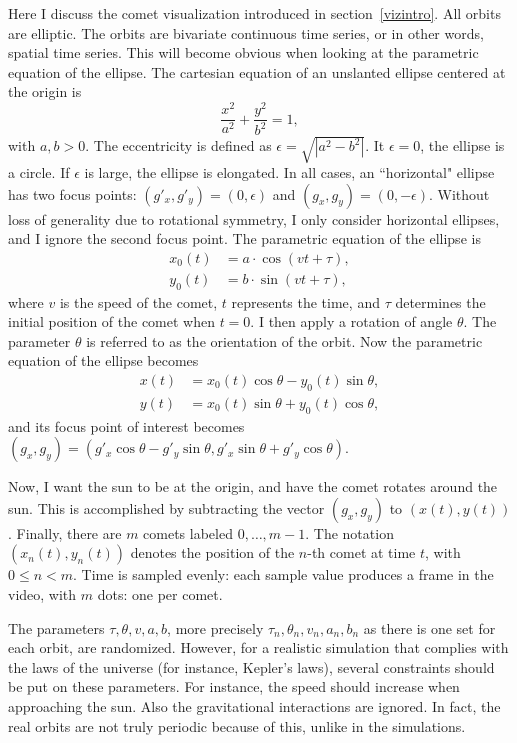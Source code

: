 \documentclass[oneside,10pt]{book}
\begin{document}
Here I discuss the comet visualization introduced in section~\ref{vizintro}. All orbits are elliptic. The orbits are bivariate continuous time series, or in other words, spatial time series. This will become obvious when looking at the parametric equation of the ellipse. The cartesian equation of an unslanted ellipse centered at the origin is
$$\frac{x^2}{a^2}+\frac{y^2}{b^2}=1,
$$
with $a,b>0$. The eccentricity is defined as $\epsilon=\sqrt{|a^2-b^2|}$. It $\epsilon=0$, the ellipse is a circle. If $\epsilon$ is large, the ellipse is elongated. In all cases, an ``horizontal" ellipse has two focus points: $(g'_x,g'_y)=(0, \epsilon)$ and $(g_x,g_y)=(0,-\epsilon)$. Without loss of generality due to rotational symmetry, I only consider horizontal ellipses, and I ignore the second focus point. The parametric equation of the ellipse is
\begin{align}
x_0(t) & = a\cdot\cos(vt+\tau),\nonumber \\
y_0(t) & = b\cdot\sin(vt+\tau),\nonumber
\end{align}
where $v$ is the speed of the comet, $t$ represents the time, and $\tau$ determines the initial position of the comet when $t=0$.
I then apply a rotation of angle $\theta$. The parameter $\theta$ is referred to as the orientation of the orbit. Now the parametric equation of the ellipse becomes
\begin{align}
x(t) & = x_0(t) \cos\theta - y_0(t)\sin \theta,\nonumber \\
y(t) & = x_0(t) \sin\theta + y_0(t)\cos \theta,\nonumber
\end{align}
and its focus point of interest becomes $(g_x,g_y)= (g'_x \cos\theta - g'_y\sin \theta,g'_x \sin\theta + g'_y\cos \theta)$.

Now, I want the sun to be at the origin, and have the comet rotates around the sun. This is accomplished by subtracting the vector $(g_x,g_y)$
to $(x(t),y(t))$. Finally, there are $m$ comets labeled $0,\dots,m-1$. The notation $(x_n(t),y_n(t))$ denotes the position of the $n$-th comet at time
$t$, with $0\leq n<m$. Time is sampled evenly: each sample value produces a frame in the video, with $m$ dots: one per comet.

The parameters $\tau,\theta,v,a,b$, more precisely $\tau_n,\theta_n,v_n,a_n,b_n$ as there is one set for each orbit, are randomized. However, for a
realistic simulation that complies with the laws of the universe (for instance, Kepler's laws), several constraints should be put on these parameters. For instance, the speed should increase when approaching the sun. Also the gravitational interactions are ignored. In fact, the real orbits are not truly periodic because of this, unlike in the simulations.
\end{document}
